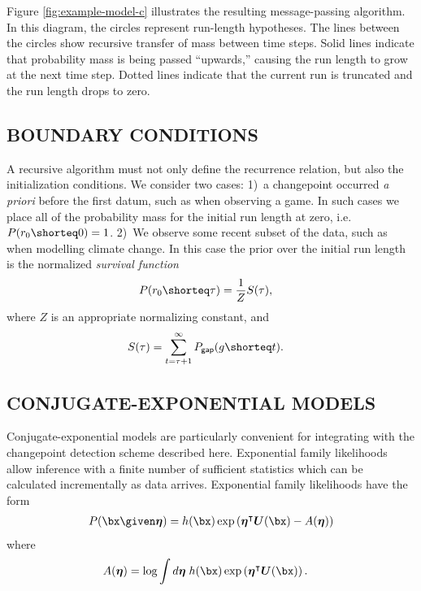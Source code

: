 \documentclass[]{article}
\newcommand{\boldeta}{\ensuremath{\boldsymbol{\eta}}}
\begin{document}
      Figure \ref{fig:example-model-c} illustrates the resulting
      message-passing algorithm.  In this diagram, the circles represent
      run-length hypotheses.  The lines between the circles show recursive
      transfer of mass between time steps.  Solid lines indicate that
      probability mass is being passed ``upwards,'' causing the run length
      to grow at the next time step.  Dotted lines indicate that the
      current run is truncated and the run length drops to zero.
      
    \subsection{BOUNDARY CONDITIONS}
      A recursive algorithm must not only define the recurrence relation,
      but also the initialization conditions.  We consider two cases: 1)~a
      changepoint occurred \textit{a priori} before the first datum, such
      as when observing a game.  In such cases we place all of the
      probability mass for the initial run length at zero, i.e.\
      $P(r_{0}\shorteq 0) = 1$.  2)~We observe some recent subset of the
      data, such as when modelling climate change.  In this case the prior
      over the initial run length is the normalized \textit{survival
      function} \cite{evans-etal-2000a}
      \begin{align}\label{eqn:survival-function}
	P(r_{0}\shorteq \tau) &= \frac{1}{Z}S(\tau),
      \end{align}
      where $Z$ is an appropriate normalizing constant, and
      \begin{align}
	S(\tau) &= \sum_{t=\tau+1}^{\infty}P_{\sf{gap}}(g\shorteq t).
      \end{align}
    
    \subsection{CONJUGATE-EXPONENTIAL MODELS}
      Conjugate-exponential models are particularly convenient for
      integrating with the changepoint detection scheme described here.
      Exponential family likelihoods allow inference with a finite number
      of sufficient statistics which can be calculated incrementally as
      data arrives.  Exponential family likelihoods have the form
      \begin{align}\label{eqn:exponential-likelihood}
        P(\bx \given \boldeta) = h(\bx)\exp\left(\boldeta^{\intercal}
                                 \boldsymbol{U}(\bx)
	                         - A(\boldeta)\right)
      \end{align}
      where
      \begin{align}\label{eqn:exponential-normalizer}
	A(\boldeta) &= \log\int d\boldeta\;
	h(\bx)\exp\left(\boldeta^{\intercal}\boldsymbol{U}(\bx)\right).
      \end{align}
\end{document}
